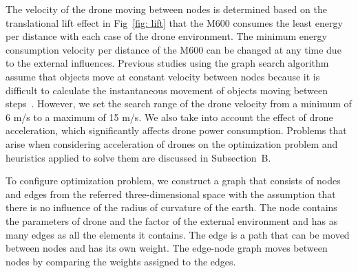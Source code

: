 \documentclass[journal]{./template/IEEEtran}
\begin{document}
The velocity of the drone moving between nodes is determined based on the translational lift effect in Fig~\ref{fig: lift} that the M600 consumes the least energy per distance with each case of the drone environment. 
The minimum energy consumption velocity per distance of the M600 can be changed at any time due to the external influences.  
Previous studies using the graph search algorithm assume that objects move at constant velocity between nodes because it is difficult to calculate the instantaneous movement of objects moving between steps~\cite{ref_8, ref_10, ref_22}. 
However, we set the search range of the drone velocity from a minimum of 6 m/s to a maximum of 15 m/s. We also take into account the effect of drone acceleration, which significantly affects drone power consumption.
Problems that arise when considering acceleration of drones on the optimization problem and heuristics applied to solve them are discussed in Subsection~B.

To configure optimization problem, we construct a graph that consists of nodes and edges from the referred three-dimensional space with the assumption that there is no influence of the radius of curvature of the earth.
The node contains the parameters of drone and the factor of the external environment and has as many edges as all the elements it contains. 
The edge is a path that can be moved between nodes and has its own weight. The edge-node graph moves between nodes by comparing the weights assigned to the edges.  

\end{document}
